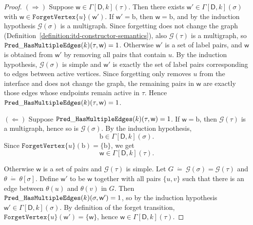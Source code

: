 \documentclass[11pt,a4paper]{article}
\newcommand{\truevalue}{1}
\newcommand{\treewidthvalue}{k}
\newcommand{\decompositiongraph}[1]{\mathcal{G}(#1)}
\newcommand{\forgetvertextype}[1]{\mathtt{ForgetVertex}\{#1\}}
\newcommand{\abstractdecomposition}{\tau}
\newcommand{\sigmaabstractdecomposition}{\sigma}
\newcommand{\defeq}{~\dot{=}~}
\newcommand{\vertexone}{u}
\newcommand{\vertextwo}{v}
\newcommand{\awitness}{\mathsf{w}}
\newcommand{\dpcore}{\mathsf{D}}
\newcommand{\dpNamePart}[1]{\mbox{\normalfont\ttfamily #1}}
\newcommand{\predicateHasMultiEdge}[1]{\dpNamePart{Pred}\_\allowbreak\dpNamePart{HasMultipleEdges}(#1)}
\newcommand{\topmapname}{\theta}
\newcommand{\topmap}[1]{\topmapname[#1]}
\newcommand{\dynamizationfunctionname}[1]{\Gamma[{#1}]}
\newcommand{\dynamizationfunction}[2]{\dynamizationfunctionname{#1,#2}}
\newcommand{\multiedgefound}{\mathrm{b}}
\begin{document}
{\begin{proof}
			$(\Rightarrow)$ Suppose \(\awitness\in \dynamizationfunction{\dpcore}{\treewidthvalue}(\abstractdecomposition)\). Then there exists \(\awitness'\in \dynamizationfunction{\dpcore}{\treewidthvalue}(\sigmaabstractdecomposition)\) with \(\awitness\in \forgetvertextype{\vertexone}(\awitness')\). If \(\awitness'=\multiedgefound\), then \(\awitness=\multiedgefound\), and by the induction hypothesis \(\decompositiongraph{\sigmaabstractdecomposition}\) is a multigraph. Since forgetting does not change the graph (Definition~\ref{definition:itd-constructor-semantics}), also \(\decompositiongraph{\abstractdecomposition}\) is a multigraph, so \(\predicateHasMultiEdge{\treewidthvalue}(\abstractdecomposition,\awitness)=\truevalue\). Otherwise \(\awitness'\) is a set of label pairs, and \(\awitness\) is obtained from \(\awitness'\) by removing all pairs that contain \(\vertexone\). By the induction hypothesis, \(\decompositiongraph{\sigmaabstractdecomposition}\) is simple and \(\awitness'\) is exactly the set of label pairs corresponding to edges between active vertices. Since forgetting only removes \(\vertexone\) from the interface and does not change the graph, the remaining pairs in \(\awitness\) are exactly those edges whose endpoints remain active in \(\abstractdecomposition\). Hence \(\predicateHasMultiEdge{\treewidthvalue}(\abstractdecomposition,\awitness)=\truevalue\).

				$(\Leftarrow)$ Suppose \(\predicateHasMultiEdge{\treewidthvalue}(\abstractdecomposition,\awitness)=\truevalue\).
					If \(\awitness=\multiedgefound\), then \(\decompositiongraph{\abstractdecomposition}\) is a multigraph, hence so is \(\decompositiongraph{\sigmaabstractdecomposition}\).
					By the induction hypothesis,
					\[
					\multiedgefound\in \dynamizationfunction{\dpcore}{\treewidthvalue}(\sigmaabstractdecomposition).
					\]
					Since \(\forgetvertextype{\vertexone}(\multiedgefound)=\{\multiedgefound\}\), we get
					\[
					\awitness\in \dynamizationfunction{\dpcore}{\treewidthvalue}(\abstractdecomposition).
					\]

				Otherwise \(\awitness\) is a set of pairs and \(\decompositiongraph{\abstractdecomposition}\) is simple.
				Let \(G\defeq \decompositiongraph{\sigmaabstractdecomposition}=\decompositiongraph{\abstractdecomposition}\) and \(\theta\defeq \topmap{\sigmaabstractdecomposition}\).
				Define \(\awitness'\) to be \(\awitness\) together with all pairs \(\{\vertexone,\vertextwo\}\) such that there is an edge between \(\theta(\vertexone)\) and \(\theta(\vertextwo)\) in \(G\).
				Then \(\predicateHasMultiEdge{\treewidthvalue}(\sigmaabstractdecomposition,\awitness')=\truevalue\), so by the induction hypothesis \(\awitness'\in \dynamizationfunction{\dpcore}{\treewidthvalue}\allowbreak(\sigmaabstractdecomposition)\).
				By definition of the forget transition, \(\forgetvertextype{\vertexone}(\awitness')=\{\awitness\}\), hence \(\awitness\in \dynamizationfunction{\dpcore}{\treewidthvalue}\allowbreak(\abstractdecomposition)\).


\end{proof}}
\end{document}
